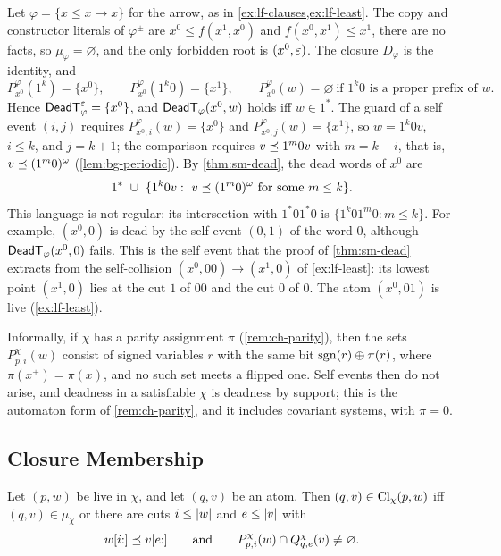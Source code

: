 \begin{example}\label{ex:sm-arrow}
Let $\varphi=\{x\le x\to x\}$ for the arrow, as in
\cref{ex:lf-clauses,ex:lf-least}. The copy and constructor literals of
$\varphi^\pm$ are $x^0\le f(x^1,x^0)$ and $f(x^0,x^1)\le x^1$, there are no
facts, so $\mu_\varphi=\varnothing$, and the only forbidden root is
$(x^0,\varepsilon)$. The closure $D_\varphi$ is the identity, and
\[
 P^\varphi_{x^0}(1^k)=\{x^0\},\qquad P^\varphi_{x^0}(1^k0)=\{x^1\},\qquad
 P^\varphi_{x^0}(w)=\varnothing\ \text{if $1^k0$ is a proper prefix of $w$}.
\]
Hence $\mathsf{DeadT}^\varepsilon_\varphi=\{x^0\}$, and $\mathsf{DeadT}_\varphi(x^0,w)$ holds iff
$w\in1^*$. The guard of a self event $(i,j)$ requires
$P^\varphi_{x^0,i}(w)=\{x^0\}$ and $P^\varphi_{x^0,j}(w)=\{x^1\}$, so
$w=1^k0v$, $i\le k$, and $j=k+1$; the comparison requires $v\preceq1^m0v$ with
$m=k-i$, that is, $v\preceq(1^m0)^\omega$ (\cref{lem:bg-periodic}). By
\cref{thm:sm-dead}, the dead words of $x^0$ are
\[
 1^*\ \cup\ \{1^k0v:\ v\pre(1^m0)^\omega\text{ for some }m\le k\}.
\]
This language is not regular: its intersection with $1^*01^*0$ is
$\{1^k01^m0:m\le k\}$. For example, $(x^0,0)$ is dead by the self event
$(0,1)$ of the word $0$, although $\mathsf{DeadT}_\varphi(x^0,0)$ fails. This is the
self event that the proof of \cref{thm:sm-dead} extracts from the
self-collision $(x^0,00)\to(x^1,0)$ of \cref{ex:lf-least}: its lowest point
$(x^1,0)$ lies at the cut $1$ of $00$ and the cut $0$ of $0$. The atom
$(x^0,01)$ is live (\cref{ex:lf-least}).
\end{example}

\begin{remark}\label{rem:sm-parity}
Informally, if $\chi$ has a parity assignment $\pi$ (\cref{rem:ch-parity}),
then the sets $P^\chi_{p,i}(w)$ consist of signed variables $r$ with the same
bit $\operatorname{sgn}(r)\oplus\pi(r)$, where $\pi(x^\pm)=\pi(x)$, and no such set meets a
flipped one. Self events then do not arise, and deadness in a satisfiable
$\chi$ is deadness by support; this is the automaton form of
\cref{rem:ch-parity}, and it includes covariant systems, with $\pi=0$.
\end{remark}

\subsection{Closure Membership}\label{sec:sm-membership}

\begin{lemma}\label{lem:sm-membership}
Let $(p,w)$ be live in $\chi$, and let $(q,v)$ be an atom. Then
$(q,v)\in\operatorname{Cl}_\chi(p,w)$ iff $(q,v)\in\mu_\chi$ or there are cuts $i\le\lvert w\rvert$
and $e\le\lvert v\rvert$ with
\[
 w[i{:}]\preceq v[e{:}]\qquad\text{and}\qquad
 P^\chi_{p,i}(w)\cap Q^\chi_{q,e}(v)\ne\varnothing .
\]
\end{lemma}

